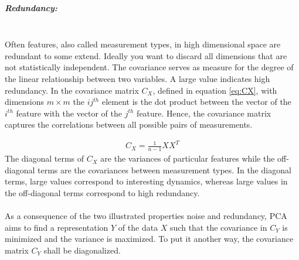 \subparagraph{Redundancy:}\mbox{}\\
Often features, also called measurement types, in high dimensional space are redundant to some extend. Ideally you want to discard all dimensions that are not statistically independent. The covariance serves as measure for the degree of the linear relationship between two variables. A large value indicates high redundancy. In the covariance matrix $C_X$, defined in equation \ref{eq:CX}, with dimensions $m \times m$ the $ij^{th}$ element is the dot product between the vector of the $i^{th}$ feature with the vector of the $j^{th}$ feature. Hence, the covariance matrix captures the correlations between all possible pairs of measurements.

\begin{align}
\label{eq:CX}
C_X=\frac{1}{n-1}XX^T
\end{align}
The diagonal terms of $C_X$ are the variances of particular features while the off-diagonal terms are the covariances between measurement types. In the diagonal terms, large values correspond to interesting dynamics, whereas large values in the off-diagonal terms correspond to high redundancy.\\
\\
As a consequence of the two illustrated properties noise and redundancy, PCA aims to find a representation $Y$ of the data $X$ such that the covariance in $C_Y$ is minimized and the variance is maximized. To put it another way, the covariance matrix $C_Y$ shall be diagonalized. 

